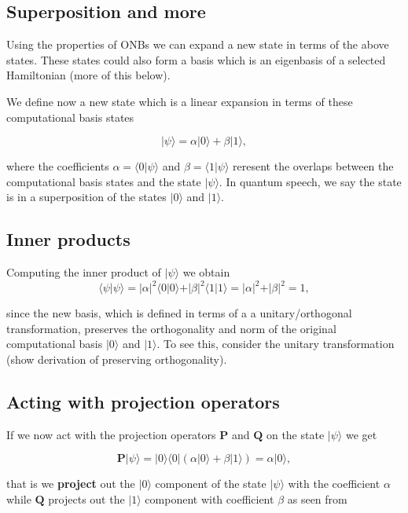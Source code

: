 \subsection{Superposition and more}

Using the properties of ONBs we can expand a new state in terms of the
above states. These states could also form  a basis which is an
eigenbasis of a selected Hamiltonian (more of this below).

We define now a new state which is a linear expansion in terms of
these computational basis states

\[
\vert \psi \rangle = \alpha \vert 0 \rangle + \beta\vert 1 \rangle,
\]

where the coefficients $\alpha = \langle 0 \vert \psi \rangle$ and
$\beta =\langle 1 \vert \psi\rangle$ reresent the overlaps between the
computational basis states and the state $\vert \psi\rangle$. In quantum speech, we say the state is in a superposition of the states $\vert 0\rangle$ and $\vert 1\rangle$.

\subsection{Inner products}
Computing the inner product of $\vert \psi \rangle$ we obtain
\[
\langle \psi \vert \psi \rangle = \vert \alpha \vert ^2\langle 0\vert 0\rangle + \vert \beta \vert ^2\langle 1\vert 1\rangle = \vert \alpha \vert ^2 + \vert \beta \vert ^2 = 1,
\]

since the new basis, which is defined in terms of a a unitary/orthogonal
transformation, preserves the orthogonality and norm of the original
computational basis $\vert 0\rangle$ and $\vert 1\rangle$. To see
this, consider the unitary transformation (show derivation of
preserving orthogonality).

\subsection{Acting with projection operators}

If we now act with the projection operators $\bm{P}$ and $\bm{Q}$ on
the state $\vert \psi\rangle$ we get

\[
\bm{P}\vert \psi \rangle = \vert 0 \rangle\langle 0\vert (\alpha \vert 0 \rangle + \beta\vert 1 \rangle)=\alpha \vert 0\rangle,
\]

that is we \textbf{project} out the $\vert 0\rangle$ component of the state
$\vert \psi\rangle$ with the coefficient $\alpha$ while $\bm{Q}$
projects out the $\vert 1\rangle$ component with coefficient $\beta$
as seen from

